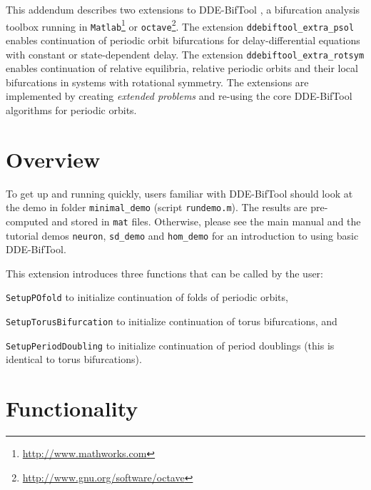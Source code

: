 \documentclass[11pt]{scrartcl}
\newcommand{\blist}[1]{\mbox{\lstinline!#1!}}  \newlength{\tabw}
\begin{document}
\maketitle
\noindent This addendum describes two extensions to DDE-BifTool
\cite{ELS01,ELR02,homoclinic,RS07,VLR08}, a bifurcation analysis
toolbox running in
\texttt{Matlab}\footnote{\url{http://www.mathworks.com}} or
\texttt{octave}\footnote{\url{http://www.gnu.org/software/octave}}. The
extension \texttt{ddebiftool_extra_psol} enables continuation of
periodic orbit bifurcations for delay-differential equations with
constant or state-dependent delay. The extension
\texttt{ddebiftool_extra_rotsym} enables continuation of relative
equilibria, relative periodic orbits and their local bifurcations in
systems with rotational symmetry. The extensions are implemented by
creating \emph{extended problems} and re-using the core DDE-BifTool
algorithms for periodic orbits.
\tableofcontents

\section{Overview}
\label{sec:quick}
To get up and running quickly, users familiar with DDE-BifTool should
look at the demo in folder \texttt{minimal\_demo} (script
\texttt{rundemo.m}). The results are pre-computed and stored in
\texttt{mat} files. Otherwise, please see the main manual and the
tutorial demos \texttt{neuron}, \texttt{sd\_demo} and \texttt{hom\_demo}
for an introduction to using basic DDE-BifTool.

\noindent This extension introduces three functions that can be called
by the user:
\begin{compactitem}
\item \blist{SetupPOfold} to initialize continuation of folds of periodic
  orbits,
\item \blist{SetupTorusBifurcation} to initialize continuation of
  torus bifurcations, and
\item \blist{SetupPeriodDoubling} to initialize
  continuation of period doublings (this is identical to torus
  bifurcations).
\end{compactitem}


\section{Functionality}
\label{sec:extra}
\end{document}
